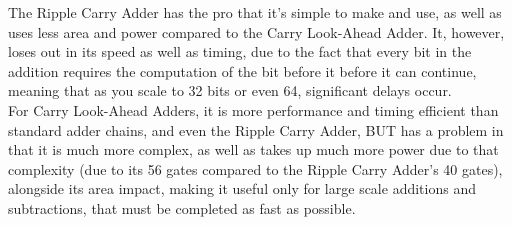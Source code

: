 The Ripple Carry Adder has the pro that it's simple to make and use, as well as uses less area and power compared to the Carry Look-Ahead Adder. It, however, loses out in its speed as well as timing, due to the fact that every bit in the addition requires the computation of the bit before it before it can continue, meaning that as you scale to 32 bits or even 64, significant delays occur.\\

For Carry Look-Ahead Adders, it is more performance and timing efficient than standard adder chains, and even the Ripple Carry Adder, BUT has a problem in that it is much more complex, as well as takes up much more power due to that complexity (due to its 56 gates compared to the Ripple Carry Adder's 40 gates), alongside its area impact, making it useful only for large scale additions and subtractions, that must be completed as fast as possible.\\


